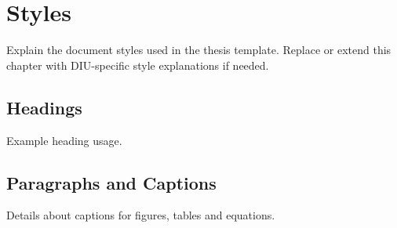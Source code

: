 \chapter{Styles}
\label{ch:styles}

Explain the document styles used in the thesis template. Replace or extend this chapter with DIU-specific style explanations if needed.

\section{Headings}
Example heading usage.

\section{Paragraphs and Captions}
Details about captions for figures, tables and equations.
